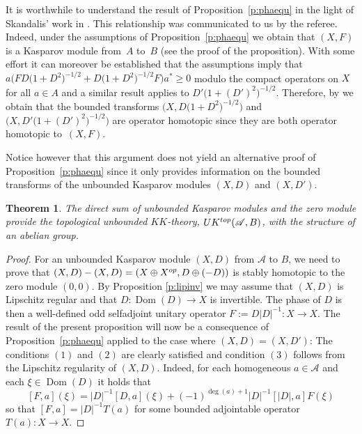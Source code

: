 \documentclass[11pt]{article}
\numberwithin{equation}{section}
\newtheorem{Theorem}{Theorem}[section]
\newcommand{\op}{\oplus}
\newcommand{\s}[1]{\mathscr{#1}}
\begin{document}
\begin{rem}It is worthwhile to understand the result of Proposition~\ref{p:phaequ} in the light of Skandalis' work in \cite{Ska:SRK}. This relationship was communicated to us by the referee. Indeed, under the assumptions of Proposition~\ref{p:phaequ} we obtain that $(X,F)$ is a Kasparov module from~$A$ to~$B$ (see the proof of the proposition). With some effort it can moreover be established that the assumptions imply that $a \big( F D\big(1 + D^2\big)^{-1/2} + D\big(1 + D^2\big)^{-1/2} F\big)a^* \geq 0$ modulo the compact operators on $X$ for all $a \in A$ and a similar result applies to $D'\big(1 + (D')^2\big)^{-1/2}$. Therefore, by \cite[Lemma~11]{Ska:SRK} we obtain that the bounded transforms $\big(X,D\big(1+D^2\big)^{-1/2}\big)$ and $\big(X,D'\big(1 + (D')^2\big)^{-1/2}\big)$ are operator homotopic since they are both operator homotopic to~$(X,F)$.

Notice however that this argument does not yield an alternative proof of Proposition~\ref{p:phaequ} since it only provides information on the bounded transforms of the unbounded Kasparov modules $(X,D)$ and $(X,D')$.
\end{rem}

\begin{Theorem}\label{t:group}The direct sum of unbounded Kasparov modules and the zero module provide the topological unbounded $KK$-theory, $UK^{{\rm top}}(\s A,B)$, with the structure of an abelian group.
\end{Theorem}
\begin{proof}For an unbounded Kasparov module $(X,D)$ from $\s A$ to $B$, we need to prove that $(X,D) - (X,D) = (X \op X^{{\rm op}}, D \op (-D))$ is stably homotopic to the zero module $(0,0)$. By Proposition \ref{p:lipinv} we may assume that $(X,D)$ is Lipschitz regular and that $D \colon \operatorname{Dom}(D) \to X$ is invertible. The phase of $D$ is then a well-defined odd selfadjoint unitary operator $F := D |D|^{-1}\colon X \to X$. The result of the present proposition will now be a consequence of Proposition~\ref{p:phaequ} applied to the case where $(X,D) = (X,D')$: The conditions $(1)$ and $(2)$ are clearly satisfied and condition $(3)$ follows from the Lipschitz regularity of $(X,D)$. Indeed, for each homogeneous $a \in \s A$ and each $\xi \in \operatorname{Dom}(D)$ it holds that
\[
[F,a](\xi) = |D|^{-1} [D,a](\xi) + (-1)^{\deg (a) + 1} |D|^{-1} [ |D|,a ] F(\xi)
\]
so that $[F,a] = |D|^{-1} T(a)$ for some bounded adjointable operator $T(a)\colon X \to X$.
\end{proof}
\end{document}
